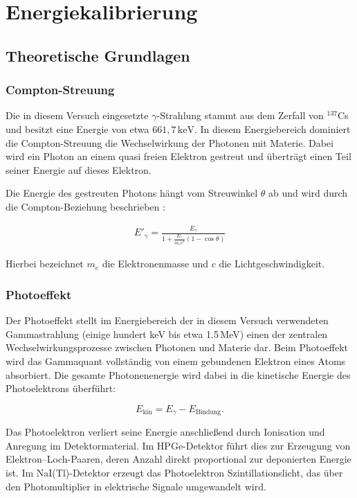 \chapter{Energiekalibrierung}
\section{Theoretische Grundlagen}

\subsection{Compton-Streuung}

Die in diesem Versuch eingesetzte $\gamma$-Strahlung stammt aus dem Zerfall von $^{137}$Cs und besitzt eine Energie von etwa $661{,}7\,\mathrm{keV}$. 
In diesem Energiebereich dominiert die Compton-Streuung die Wechselwirkung der Photonen mit Materie. 
Dabei wird ein Photon an einem quasi freien Elektron gestreut und überträgt einen Teil seiner Energie auf dieses Elektron.

Die Energie des gestreuten Photons hängt vom Streuwinkel $\theta$ ab und wird durch die Compton-Beziehung beschrieben \cite{Wermes}:

\begin{align}
    E'_\gamma = \frac{E_\gamma}
    {1+\frac{E_\gamma}{m_e c^2}(1-\cos\theta)}
    \label{eq:compton}
\end{align}

Hierbei bezeichnet $m_e$ die Elektronenmasse und $c$ die Lichtgeschwindigkeit.
\subsection{Photoeffekt}

Der Photoeffekt stellt im Energiebereich der in diesem Versuch verwendeten Gammastrahlung
(einige hundert keV bis etwa 1.5\,MeV) einen der zentralen Wechselwirkungsprozesse zwischen
Photonen und Materie dar. Beim Photoeffekt wird das Gammaquant vollständig von einem
gebundenen Elektron eines Atoms absorbiert. Die gesamte Photonenenergie wird dabei in die
kinetische Energie des Photoelektrons überführt:\cite{Knoll}

\[
E_{\mathrm{kin}} = E_\gamma - E_{\mathrm{Bindung}}.
\]

Das Photoelektron verliert seine Energie anschließend durch Ionisation und Anregung im
Detektormaterial. Im HPGe-Detektor führt dies zur Erzeugung von Elektron--Loch-Paaren,
deren Anzahl direkt proportional zur deponierten Energie ist. Im NaI(Tl)-Detektor erzeugt
das Photoelektron Szintillationslicht, das über den Photomultiplier in elektrische Signale
umgewandelt wird.\\

